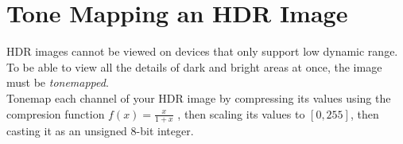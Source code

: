 \documentclass{article}
\begin{document}
\begin{figure}[h]
    \centering
\end{figure}

\newpage

\section{Tone Mapping an HDR Image}
HDR images cannot be viewed on devices that only support low dynamic range. To be able to view all the details of dark and bright areas at once, the image must be \emph{tonemapped}. \\

\noindent
Tonemap each channel of your HDR image by compressing its values using the compresion function $f(x)=\frac{x}{1+x}$ , then scaling its values to $[0,255]$, then casting it as an unsigned 8-bit integer. 
\begin{figure}[h]
    \centering
\end{figure}
\end{document}
